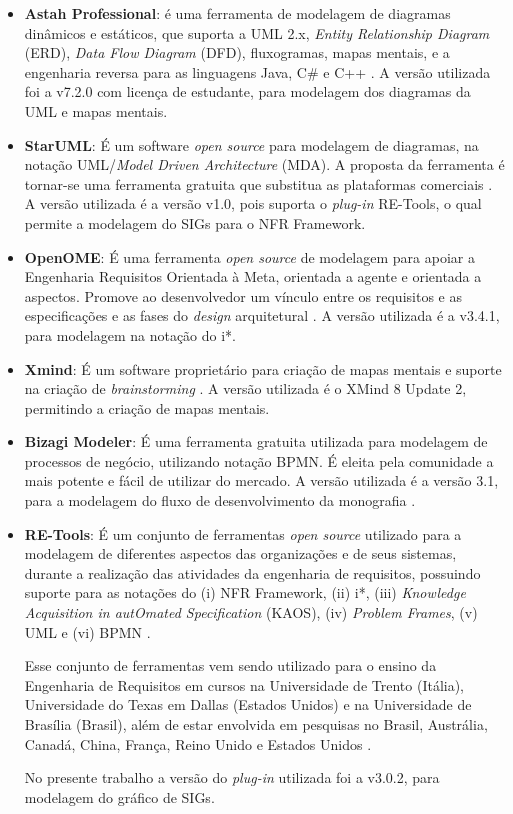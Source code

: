 \begin{itemize}
	\item \textbf{Astah Professional}: é uma ferramenta de modelagem de diagramas dinâmicos e estáticos, que suporta a UML 2.x, \textit{Entity Relationship Diagram} (ERD), \textit{Data Flow Diagram} (DFD), fluxogramas, mapas mentais, e a engenharia reversa para as linguagens Java, C\# e C++ \cite{astah}. A versão utilizada foi a v7.2.0 com licença de estudante, para modelagem dos diagramas da UML e mapas mentais.   
	
	\item \textbf{StarUML}: É um software \textit{open source} para modelagem de diagramas, na notação UML/\textit{Model Driven Architecture} (MDA). A proposta da ferramenta é tornar-se uma ferramenta gratuita que substitua as plataformas comerciais \cite{starUML}. A versão utilizada é a versão v1.0, pois suporta o \textit{plug-in} RE-Tools, o qual permite a modelagem do SIGs para o NFR Framework. 
	
	\item \textbf{OpenOME}: É uma ferramenta \textit{open source} de modelagem para apoiar a Engenharia Requisitos Orientada à Meta, orientada a agente e orientada a aspectos. Promove ao desenvolvedor um vínculo entre os requisitos e as especificações e as fases do \textit{design} arquitetural \cite{openOME}. A versão utilizada é a v3.4.1, para modelagem na notação do i*. 
	
	\item \textbf{Xmind}: É um software proprietário para criação de mapas mentais e suporte na criação de \textit{brainstorming} \cite{xMind}. A versão utilizada é o XMind 8 Update 2, permitindo a criação de mapas mentais. 
	
	\item \textbf{Bizagi Modeler}: É uma ferramenta gratuita utilizada para modelagem de processos de negócio, utilizando notação BPMN. É eleita pela comunidade a mais potente e fácil de utilizar do mercado. A versão utilizada é a versão 3.1, para a modelagem do fluxo de desenvolvimento da monografia \cite{bizagi}. 
	
	\item \textbf{RE-Tools}: É um conjunto de ferramentas \textit{open source} utilizado para a modelagem de diferentes aspectos das organizações e de seus sistemas, durante a realização das atividades da engenharia de requisitos, possuindo suporte para as notações do (i) NFR Framework, (ii) i*, (iii) \textit{Knowledge Acquisition in autOmated Specification} (KAOS), (iv) \textit{Problem Frames}, (v) UML e (vi) BPMN \cite{reTools} \cite{supakkul2012re}.
	
	Esse conjunto de ferramentas vem sendo utilizado para o ensino da Engenharia de Requisitos em cursos na Universidade de Trento (Itália), Universidade do Texas em Dallas (Estados Unidos) e na Universidade de Brasília (Brasil), além de estar envolvida em pesquisas no Brasil, Austrália, Canadá, China, França, Reino Unido e Estados Unidos \cite{supakkul2012re}. 
	
	No presente trabalho a versão do \textit{plug-in} utilizada foi a v3.0.2, para modelagem do gráfico de SIGs. 
\end{itemize}

